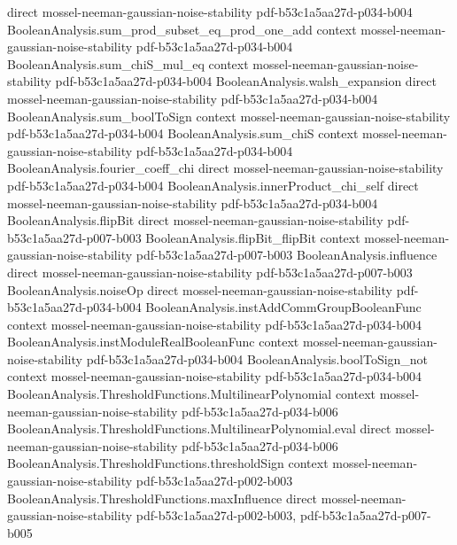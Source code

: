 \begin{theorem}
  {direct}
  {mossel-neeman-gaussian-noise-stability}
  {pdf-b53c1a5aa27d-p034-b004}
\proofstep
  {BooleanAnalysis.sum_prod_subset_eq_prod_one_add}
  {context}
  {mossel-neeman-gaussian-noise-stability}
  {pdf-b53c1a5aa27d-p034-b004}
\proofstep
  {BooleanAnalysis.sum_chiS_mul_eq}
  {context}
  {mossel-neeman-gaussian-noise-stability}
  {pdf-b53c1a5aa27d-p034-b004}
\proofstep
  {BooleanAnalysis.walsh_expansion}
  {direct}
  {mossel-neeman-gaussian-noise-stability}
  {pdf-b53c1a5aa27d-p034-b004}
\proofstep
  {BooleanAnalysis.sum_boolToSign}
  {context}
  {mossel-neeman-gaussian-noise-stability}
  {pdf-b53c1a5aa27d-p034-b004}
\proofstep
  {BooleanAnalysis.sum_chiS}
  {context}
  {mossel-neeman-gaussian-noise-stability}
  {pdf-b53c1a5aa27d-p034-b004}
\proofstep
  {BooleanAnalysis.fourier_coeff_chi}
  {direct}
  {mossel-neeman-gaussian-noise-stability}
  {pdf-b53c1a5aa27d-p034-b004}
\proofstep
  {BooleanAnalysis.innerProduct_chi_self}
  {direct}
  {mossel-neeman-gaussian-noise-stability}
  {pdf-b53c1a5aa27d-p034-b004}
\proofstep
  {BooleanAnalysis.flipBit}
  {direct}
  {mossel-neeman-gaussian-noise-stability}
  {pdf-b53c1a5aa27d-p007-b003}
\proofstep
  {BooleanAnalysis.flipBit_flipBit}
  {context}
  {mossel-neeman-gaussian-noise-stability}
  {pdf-b53c1a5aa27d-p007-b003}
\proofstep
  {BooleanAnalysis.influence}
  {direct}
  {mossel-neeman-gaussian-noise-stability}
  {pdf-b53c1a5aa27d-p007-b003}
\proofstep
  {BooleanAnalysis.noiseOp}
  {direct}
  {mossel-neeman-gaussian-noise-stability}
  {pdf-b53c1a5aa27d-p034-b004}
\proofstep
  {BooleanAnalysis.instAddCommGroupBooleanFunc}
  {context}
  {mossel-neeman-gaussian-noise-stability}
  {pdf-b53c1a5aa27d-p034-b004}
\proofstep
  {BooleanAnalysis.instModuleRealBooleanFunc}
  {context}
  {mossel-neeman-gaussian-noise-stability}
  {pdf-b53c1a5aa27d-p034-b004}
\proofstep
  {BooleanAnalysis.boolToSign_not}
  {context}
  {mossel-neeman-gaussian-noise-stability}
  {pdf-b53c1a5aa27d-p034-b004}
\proofstep
  {BooleanAnalysis.ThresholdFunctions.MultilinearPolynomial}
  {context}
  {mossel-neeman-gaussian-noise-stability}
  {pdf-b53c1a5aa27d-p034-b006}
\proofstep
  {BooleanAnalysis.ThresholdFunctions.MultilinearPolynomial.eval}
  {direct}
  {mossel-neeman-gaussian-noise-stability}
  {pdf-b53c1a5aa27d-p034-b006}
\proofstep
  {BooleanAnalysis.ThresholdFunctions.thresholdSign}
  {context}
  {mossel-neeman-gaussian-noise-stability}
  {pdf-b53c1a5aa27d-p002-b003}
\proofstep
  {BooleanAnalysis.ThresholdFunctions.maxInfluence}
  {direct}
  {mossel-neeman-gaussian-noise-stability}
  {pdf-b53c1a5aa27d-p002-b003,
    pdf-b53c1a5aa27d-p007-b005}

\end{theorem}
